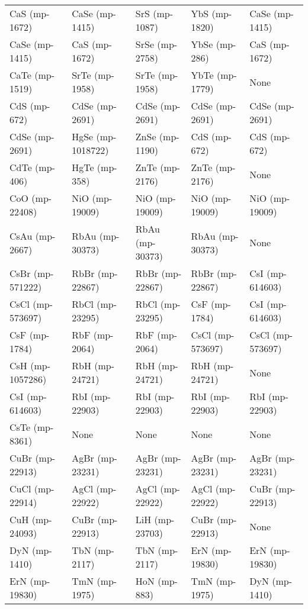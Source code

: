 \begin{longtable}{lllll}
    CaS (mp-1672) &    CaSe (mp-1415) &     SrS (mp-1087) &     YbS (mp-1820) &    CaSe (mp-1415) \\
   CaSe (mp-1415) &     CaS (mp-1672) &    SrSe (mp-2758) &     YbSe (mp-286) &     CaS (mp-1672) \\
   CaTe (mp-1519) &    SrTe (mp-1958) &    SrTe (mp-1958) &    YbTe (mp-1779) &              None \\
     CdS (mp-672) &    CdSe (mp-2691) &    CdSe (mp-2691) &    CdSe (mp-2691) &    CdSe (mp-2691) \\
   CdSe (mp-2691) & HgSe (mp-1018722) &    ZnSe (mp-1190) &      CdS (mp-672) &      CdS (mp-672) \\
    CdTe (mp-406) &     HgTe (mp-358) &    ZnTe (mp-2176) &    ZnTe (mp-2176) &              None \\
   CoO (mp-22408) &    NiO (mp-19009) &    NiO (mp-19009) &    NiO (mp-19009) &    NiO (mp-19009) \\
   CsAu (mp-2667) &   RbAu (mp-30373) &   RbAu (mp-30373) &   RbAu (mp-30373) &              None \\
 CsBr (mp-571222) &   RbBr (mp-22867) &   RbBr (mp-22867) &   RbBr (mp-22867) &   CsI (mp-614603) \\
 CsCl (mp-573697) &   RbCl (mp-23295) &   RbCl (mp-23295) &     CsF (mp-1784) &   CsI (mp-614603) \\
    CsF (mp-1784) &     RbF (mp-2064) &     RbF (mp-2064) &  CsCl (mp-573697) &  CsCl (mp-573697) \\
 CsH (mp-1057286) &    RbH (mp-24721) &    RbH (mp-24721) &    RbH (mp-24721) &              None \\
  CsI (mp-614603) &    RbI (mp-22903) &    RbI (mp-22903) &    RbI (mp-22903) &    RbI (mp-22903) \\
   CsTe (mp-8361) &              None &              None &              None &              None \\
  CuBr (mp-22913) &   AgBr (mp-23231) &   AgBr (mp-23231) &   AgBr (mp-23231) &   AgBr (mp-23231) \\
  CuCl (mp-22914) &   AgCl (mp-22922) &   AgCl (mp-22922) &   AgCl (mp-22922) &   CuBr (mp-22913) \\
   CuH (mp-24093) &   CuBr (mp-22913) &    LiH (mp-23703) &   CuBr (mp-22913) &              None \\
    DyN (mp-1410) &     TbN (mp-2117) &     TbN (mp-2117) &    ErN (mp-19830) &    ErN (mp-19830) \\
   ErN (mp-19830) &     TmN (mp-1975) &      HoN (mp-883) &     TmN (mp-1975) &     DyN (mp-1410) \\

\end{longtable}
